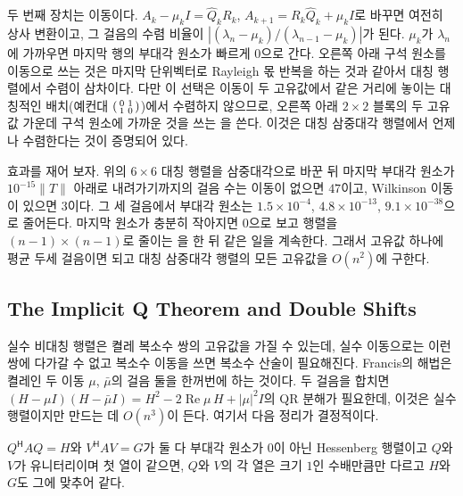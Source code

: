 두 번째 장치는 이동이다. $A_k-\mu_kI=\hat Q_kR_k$, $A_{k+1}=R_k\hat Q_k+\mu_kI$로 바꾸면 여전히 상사 변환이고, 그 걸음의 수렴 비율이 $|(\lambda_n-\mu_k)/(\lambda_{n-1}-\mu_k)|$가 된다. $\mu_k$가 $\lambda_n$에 가까우면 마지막 행의 부대각 원소가 빠르게 $0$으로 간다. 오른쪽 아래 구석 원소를 이동으로 쓰는 것은 마지막 단위벡터로 Rayleigh 몫 반복을 하는 것과 같아서 대칭 행렬에서 수렴이 삼차이다. 다만 이 선택은 이동이 두 고유값에서 같은 거리에 놓이는 대칭적인 배치(예컨대 $\begin{psmallmatrix}0&1\\1&0\end{psmallmatrix}$)에서 수렴하지 않으므로, 오른쪽 아래 $2\times2$ 블록의 두 고유값 가운데 구석 원소에 가까운 것을 쓰는 을 쓴다. 이것은 대칭 삼중대각 행렬에서 언제나 수렴한다는 것이 증명되어 있다\cite{parlett1998}.

효과를 재어 보자. 위의 $6\times6$ 대칭 행렬을 삼중대각으로 바꾼 뒤 마지막 부대각 원소가 $10^{-15}\|T\|$ 아래로 내려가기까지의 걸음 수는 이동이 없으면 $47$이고, Wilkinson 이동이 있으면 $3$이다. 그 세 걸음에서 부대각 원소는 $1.5\times10^{-4}$, $4.8\times10^{-13}$, $9.1\times10^{-38}$으로 줄어든다. 마지막 원소가 충분히 작아지면 $0$으로 보고 행렬을 $(n-1)\times(n-1)$로 줄이는 을 한 뒤 같은 일을 계속한다. 그래서 고유값 하나에 평균 두세 걸음이면 되고 대칭 삼중대각 행렬의 모든 고유값을 $O(n^2)$에 구한다.

\subsection{The Implicit Q Theorem and Double Shifts}

실수 비대칭 행렬은 켤레 복소수 쌍의 고유값을 가질 수 있는데, 실수 이동으로는 이런 쌍에 다가갈 수 없고 복소수 이동을 쓰면 복소수 산술이 필요해진다. Francis의 해법은 켤레인 두 이동 $\mu$, $\bar\mu$의 걸음 둘을 한꺼번에 하는 것이다. 두 걸음을 합치면 $(H-\mu I)(H-\bar\mu I)=H^2-2\operatorname{Re}\mu\,H+|\mu|^2I$의 QR 분해가 필요한데, 이것은 실수 행렬이지만 만드는 데 $O(n^3)$이 든다. 여기서 다음 정리가 결정적이다.

\begin{theorem}[암시적 Q 정리]
\label{thm:implicit-q}
$Q^{\mathsf H}AQ=H$와 $V^{\mathsf H}AV=G$가 둘 다 부대각 원소가 $0$이 아닌 Hessenberg 행렬이고 $Q$와 $V$가 유니터리이며 첫 열이 같으면, $Q$와 $V$의 각 열은 크기 $1$인 수배만큼만 다르고 $H$와 $G$도 그에 맞추어 같다.
\end{theorem}

